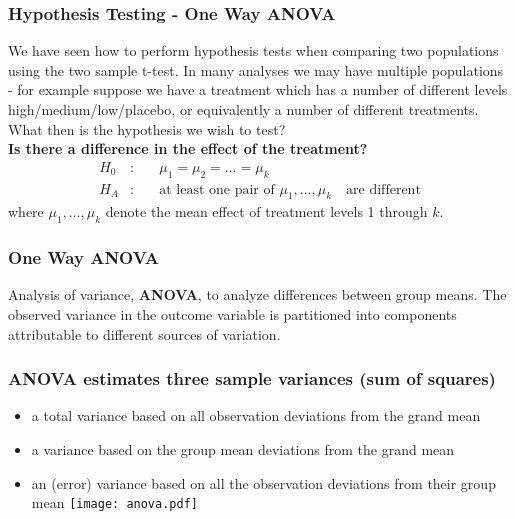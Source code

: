 \documentclass{beamer}\usepackage[]{graphicx}\usepackage[]{color}
\begin{document}
{{{\begin{frame}
\begin{itemize}
\end{itemize}
\end{frame}


\usebackgroundtemplate{}
\begin{frame}
\frametitle{Hypothesis Testing - One Way ANOVA}
We have seen how to perform hypothesis tests when comparing two populations using
the two sample t-test. In many analyses we may have multiple populations - for
example suppose we have a treatment which has a number of different levels
high/medium/low/placebo, or equivalently a number of different treatments.
What then is the hypothesis we wish to test?\\
\vspace{0.3cm} {\bfseries Is there a difference in the effect of the treatment?}
\begin{eqnarray}
H_0&:&\quad \mu_1=\mu_2=\dots=\mu_k\nonumber\\
H_A&:&\quad \mbox{at least one pair of }\mu_1,\dots,\mu_k \quad \text{are different}
\nonumber
\end{eqnarray}
where $\mu_1,\dots,\mu_k$ denote the mean effect of treatment levels 1 through $k$.
\end{frame}


\usebackgroundtemplate{}
\begin{frame}
\frametitle{One Way ANOVA}
Analysis of variance, {\bfseries ANOVA}, to analyze differences between group
means. The observed variance in the outcome variable is partitioned into
components attributable to different sources of variation.
\end{frame}


\usebackgroundtemplate{}
\begin{frame}
\frametitle{ANOVA  estimates three sample variances (sum of squares)}
\begin{itemize}
\item a total variance based on all observation deviations from the grand mean
\item a variance based on the group mean deviations from the grand mean
\item an (error) variance based on all the observation deviations from their
group mean
\texttt{[image: anova.pdf]}
\end{itemize}
\end{frame}

}}}
\end{document}
